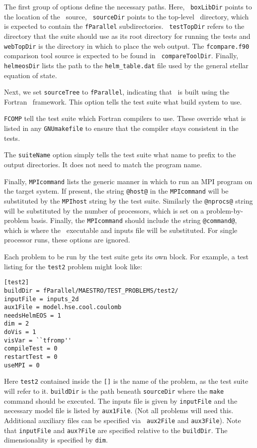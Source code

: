 The first group of options define the necessary paths.  Here, {\tt
  boxLibDir} points to the location of the \boxlib\ source, {\tt
  sourceDir} points to the top-level \maestro\ directory, which is
expected to contain the {\tt fParallel} subdirectories.  {\tt
  testTopDir} refers to the directory that the suite should use as its
root directory for running the tests and {\tt webTopDir} is the
directory in which to place the web output.  The {\tt fcompare.f90}
comparison tool source is expected to be found in {\tt
  compareToolDir}.  Finally, {\tt helmeosDir} lists the path to the
{\tt helm\_table.dat} file used by the general stellar equation of
state.

Next, we set {\tt sourceTree} to {\tt fParallel}, indicating that
\maestro\ is built using the Fortran \boxlib\ framework.  This option
tells the test suite what build system to use.

{\tt FCOMP} tell the test suite which Fortran compilers to use.  These
override what is listed in any {\tt GNUmakefile} to ensure that the
compiler stays consistent in the tests.

The {\tt suiteName} option simply tells the test suite what name to
prefix to the output directories.  It does not need to match the
program name.  

Finally, {\tt MPIcommand} lists the generic manner in which to run an
MPI program on the target system.  If present, the string {\tt @host@}
in the {\tt MPIcommand} will be substituted by the {\tt MPIhost}
string by the test suite.  Similarly the {\tt @nprocs@} string will be
substituted by the number of processors, which is set on a
problem-by-problem basis.  Finally, the {\tt MPIcommand} should
include the string {\tt @command@}, which is where the
\maestro\ executable and inputs file will be substituted.  For single
processor runs, these options are ignored.

Each problem to be run by the test suite gets its own block.  For
example, a test listing for the {\tt test2} problem might look like:

\begin{lstlisting}
[test2]
buildDir = fParallel/MAESTRO/TEST_PROBLEMS/test2/
inputFile = inputs_2d
aux1File = model.hse.cool.coulomb
needsHelmEOS = 1
dim = 2
doVis = 1
visVar = ``tfromp''
compileTest = 0 
restartTest = 0
useMPI = 0
\end{lstlisting}

Here {\tt test2} contained inside the {\tt []} is the name of the
problem, as the test suite will refer to it.  {\tt buildDir} is the
path beneath {\tt sourceDir} where the {\tt make} command should be
executed.  The inputs file is given by {\tt inputFile} and the
necessary model file is listed by {\tt aux1File}. (Not all problems
will need this.  Additional auxiliary files can be specified via {\tt
  aux2File} and {\tt aux3File}).  Note that {\tt inputFile} and {\tt aux?File} are
specified relative to the {\tt buildDir}. The dimensionality is specified by {\tt dim}.

